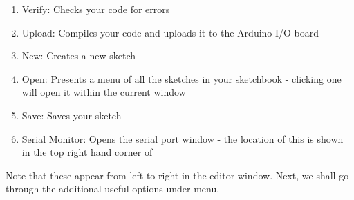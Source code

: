 \begin{enumerate}
      \item Verify: Checks your code for errors
      \item Upload: Compiles your code and uploads it to the Arduino I/O
            board
      \item New: Creates a new sketch
      \item Open: Presents a menu of all the sketches in your
            sketchbook - clicking one will open it within the current window
      \item Save: Saves your sketch
      \item Serial Monitor: Opens the serial port window - the location of
            this is shown in the top right hand corner of 
\end{enumerate}
Note that these appear from left to right in the editor window. Next, we shall go through the additional useful options under menu.
